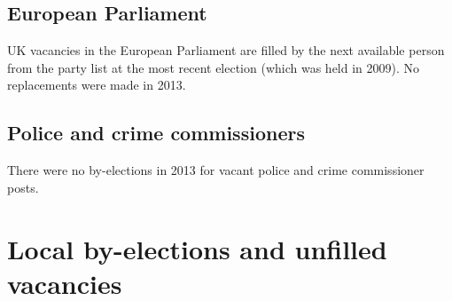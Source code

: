 \section{European Parliament}

UK vacancies in the European Parliament are filled by the next available person from the party list at the most recent election (which was held in 2009).
No replacements were made in 2013.


\section{Police and crime commissioners}

There were no by-elections in 2013 for vacant police and crime commissioner posts.

\chapter{Local by-elections and unfilled vacancies}

